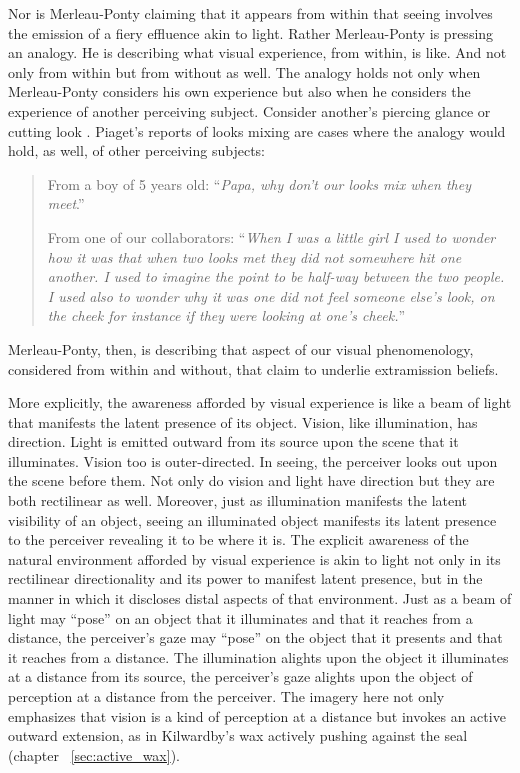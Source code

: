 Nor is Merleau-Ponty claiming that it appears from within that seeing involves the emission of a fiery effluence akin to light. Rather Merleau-Ponty is pressing an analogy. He is describing what visual experience, from within, is like. And not only from within but from without as well. The analogy holds not only when Merleau-Ponty considers his own experience but also when he considers the experience of another perceiving subject. Consider another's piercing glance or cutting look \citep[140]{Winer:1996as}. Piaget's reports of looks mixing are cases where the analogy would hold, as well, of other perceiving subjects: 
\begin{quotation}
	From a boy of 5 years old: ``\emph{Papa, why don't our looks mix when they meet}.''
	
	From one of our collaborators: ``\emph{When I was a little girl I used to wonder how it was that when two looks met they did not somewhere hit one another. I used to imagine the point to be half-way between the two people. I used also to wonder why it was one did not feel someone else's look, on the cheek for instance if they were looking at one's cheek.}'' \citep[48]{Piaget:1929dp}
\end{quotation}
Merleau-Ponty, then, is describing that aspect of our visual phenomenology, considered from within and without, that \citet{Winer:1996as} claim to underlie extramission beliefs. 

More explicitly, the awareness afforded by visual experience is like a beam of light that manifests the latent presence of its object. Vision, like illumination, has direction. Light is emitted outward from its source upon the scene that it illuminates.  Vision too is outer-directed. In seeing, the perceiver looks out upon the scene before them. Not only do vision and light have direction but they are both rectilinear as well. Moreover, just as illumination manifests the latent visibility of an object, seeing an illuminated object manifests its latent presence to the perceiver revealing it to be where it is. The explicit awareness of the natural environment afforded by visual experience is akin to light not only in its rectilinear directionality and its power to manifest latent presence, but in the manner in which it discloses distal aspects of that environment. Just as a beam of light may ``pose'' on an object that it illuminates and that it reaches from a distance, the perceiver's gaze may ``pose'' on the object that it presents and that it reaches from a distance. The illumination alights upon the object it illuminates at a distance from its source, the perceiver's gaze alights upon the object of perception at a distance from the perceiver. The imagery here not only emphasizes that vision is a kind of perception at a distance but invokes an active outward extension, as in Kilwardby's wax actively pushing against the seal (chapter ~\ref{sec:active_wax}).

